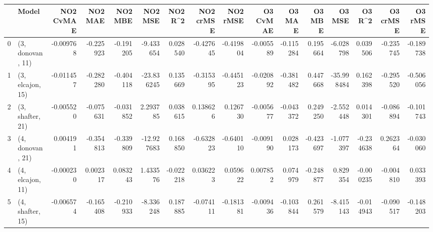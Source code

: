 \begin{tabular}{llrrrrrrrrrrrrrr}
\toprule
{} &             Model &  NO2 CvMAE &   NO2 MAE &   NO2 MBE &    NO2 MSE &   NO2 R\textasciicircum2 &  NO2 crMSE &  NO2 rMSE &  O3 CvMAE &    O3 MAE &    O3 MBE &     O3 MSE &    O3 R\textasciicircum2 &  O3 crMSE &   O3 rMSE \\
\midrule
0 &  (3, donovan, 11) &  -0.009768 & -0.225923 & -0.191205 &  -9.433654 &  0.028540 &  -0.427645 & -0.419804 & -0.005589 & -0.115284 &  0.195664 &  -6.028798 &  0.039506 & -0.235745 & -0.189738 \\
1 &  (3, elcajon, 15) &  -0.011457 & -0.282280 & -0.404118 & -23.836245 &  0.135669 &  -0.315395 & -0.445123 & -0.020892 & -0.381482 &  0.447668 & -35.998484 &  0.162398 & -0.295520 & -0.506056 \\
2 &  (3, shafter, 21) &  -0.005520 & -0.075631 & -0.031852 &   2.293785 &  0.038615 &   0.138626 &  0.126730 & -0.005677 & -0.043372 &  0.249250 &  -2.552448 &  0.014301 & -0.086894 & -0.101743 \\
3 &  (4, donovan, 21) &   0.004191 & -0.354813 & -0.339809 & -12.927683 &  0.168850 &  -0.632823 & -0.640110 & -0.009190 &  0.028173 & -0.423697 &  -1.077397 & -0.234638 &  0.262364 & -0.030060 \\
4 &  (4, elcajon, 11) &  -0.000230 &  0.002317 &  0.083243 &   1.433576 & -0.022218 &   0.036223 &  0.059622 &  0.007852 &  0.074979 & -0.248877 &   0.829354 & -0.000235 & -0.004810 &  0.033393 \\
5 &  (4, shafter, 15) &  -0.006574 & -0.165408 & -0.210933 &  -8.336248 &  0.187885 &  -0.074111 & -0.181381 & -0.009436 & -0.103844 &  0.261579 &  -8.415143 & -0.014943 & -0.090517 & -0.148203 \\
\bottomrule
\end{tabular}
